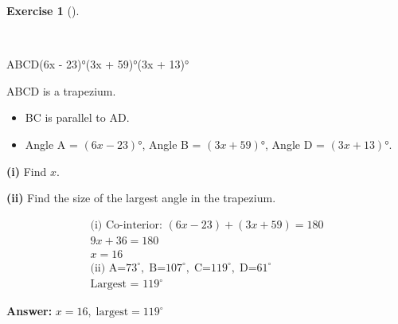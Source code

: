 \documentclass[
  letterpaper,
  DIV=11,
  numbers=noendperiod]{scrreprt}
\providecommand{\tightlist}{%
  \setlength{\itemsep}{0pt}\setlength{\parskip}{0pt}}
\theoremstyle{definition}
\newtheorem{exercise}{Exercise}[chapter]
\theoremstyle{remark}
\begin{document}
\begin{exercise}[]\protect\hypertarget{exr-u5-20-1}{}\label{exr-u5-20-1}

~

ABCD(6x - 23)°(3x + 59)°(3x + 13)°

ABCD is a trapezium.

\begin{itemize}
\tightlist
\item
  BC is parallel to AD.
\item
  Angle A = \((6x - 23)°\), Angle B = \((3x + 59)°\), Angle D =
  \((3x + 13)°\).
\end{itemize}

\textbf{(i)} Find \(x\).

\textbf{(ii)} Find the size of the largest angle in the trapezium.

\begin{tcolorbox}[enhanced jigsaw, opacitybacktitle=0.6, coltitle=black, arc=.35mm, colframe=quarto-callout-tip-color-frame, colback=white, bottomrule=.15mm, left=2mm, colbacktitle=quarto-callout-tip-color!10!white, titlerule=0mm, opacityback=0, title=\textcolor{quarto-callout-tip-color}{\faLightbulb}\hspace{0.5em}{🔍 View Solution}, leftrule=.75mm, breakable, rightrule=.15mm, bottomtitle=1mm, toptitle=1mm, toprule=.15mm]

\begin{align*}
\text{(i) Co-interior: } (6x-23) + (3x+59) = 180 \\ 9x + 36 = 180 \\ x = 16 \\ \text{(ii) } \text{A=}73^\circ,\; \text{B=}107^\circ,\; \text{C=}119^\circ,\; \text{D=}61^\circ \\ \text{Largest = }119^\circ
\end{align*}

\textbf{Answer:} \(x=16,\; \text{largest} = 119^\circ\)

\end{tcolorbox}

\end{exercise}
\end{document}
